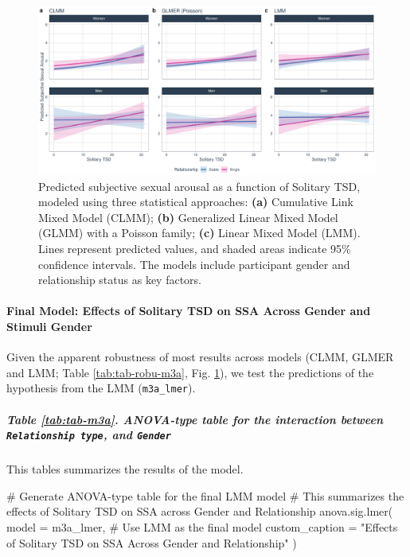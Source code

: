 \documentclass[
  bookmarksnumbered]{article}
\newenvironment{Shaded}{\begin{snugshade}}{\end{snugshade}}
\newcommand{\AttributeTok}[1]{\textcolor[rgb]{0.80,0.80,0.80}{#1}}
\newcommand{\CommentTok}[1]{\textcolor[rgb]{0.50,0.62,0.50}{#1}}
\newcommand{\FunctionTok}[1]{\textcolor[rgb]{0.94,0.94,0.56}{#1}}
\newcommand{\NormalTok}[1]{\textcolor[rgb]{0.80,0.80,0.80}{#1}}
\newcommand{\StringTok}[1]{\textcolor[rgb]{0.80,0.58,0.58}{#1}}
\begin{document}
\begin{figure}
\centering
\includegraphics{Sexual_Desire_Arousal_files/figure-latex/preds-m3a-1.pdf}
\caption{\label{fig:preds-m3a}Predicted subjective sexual arousal as a function of Solitary TSD, modeled using three statistical approaches: \textbf{(a)} Cumulative Link Mixed Model (CLMM); \textbf{(b)} Generalized Linear Mixed Model (GLMM) with a Poisson family; \textbf{(c)} Linear Mixed Model (LMM). Lines represent predicted values, and shaded areas indicate 95\% confidence intervals. The models include participant gender and relationship status as key factors.}
\end{figure}

\paragraph{Final Model: Effects of Solitary TSD on SSA Across Gender and Stimuli Gender}\label{final-model-effects-of-solitary-tsd-on-ssa-across-gender-and-stimuli-gender-1}

Given the apparent robustness of most results across models (CLMM, GLMER and LMM; Table \ref{tab:tab-robu-m3a}, Fig. \ref{fig:preds-m3a}), we test the predictions of the hypothesis from the LMM (\texttt{m3a\_lmer}).

\subparagraph{\texorpdfstring{Table \ref{tab:tab-m3a}. ANOVA-type table for the interaction between \texttt{Relationship\ type}, and \texttt{Gender}}{Table \ref{tab:tab-m3a}. ANOVA-type table for the interaction between Relationship type, and Gender}}\label{table-reftabtab-m3a.-anova-type-table-for-the-interaction-between-relationship-type-and-gender}

This tables summarizes the results of the model.

\begin{Shaded}
\begin{Highlighting}[]
\CommentTok{\# Generate ANOVA{-}type table for the final LMM model}
\CommentTok{\# This summarizes the effects of Solitary TSD on SSA across Gender and Relationship}
\FunctionTok{anova.sig.lmer}\NormalTok{(}
  \AttributeTok{model =}\NormalTok{ m3a\_lmer, }\CommentTok{\# Use LMM as the final model}
  \AttributeTok{custom\_caption =} \StringTok{"Effects of Solitary TSD on SSA Across Gender and Relationship"}
\NormalTok{)}
\end{Highlighting}
\end{Shaded}
\end{document}
